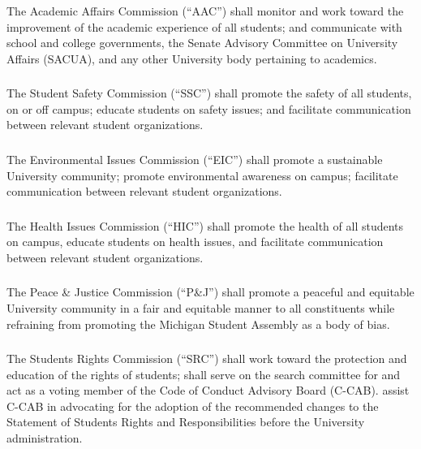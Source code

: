 \subsubsection{}
The Academic Affairs Commission (``AAC'') shall 
\subsubsubsection{}
monitor and work toward the improvement of the academic experience of all students; and
\subsubsubsection{}
communicate with school and college governments, the Senate Advisory Committee on University Affairs (SACUA), and any other University body pertaining to academics.

\subsubsection{}
The Student Safety Commission (``SSC'') shall promote the safety of all students, on or off campus; educate students on safety issues; and facilitate communication between relevant student organizations.

\subsubsection{}
The Environmental Issues Commission (``EIC'') shall
\subsubsubsection{}
promote a sustainable University community;
\subsubsubsection{}
promote environmental awareness on campus;
\subsubsubsection{}
facilitate communication between relevant student organizations.

\subsubsection{}
The Health Issues Commission (``HIC'') shall promote the health of all students on campus, educate students on health issues, and facilitate communication between relevant student organizations.

\subsubsection{}
The Peace \& Justice Commission (``P\&J'') shall promote a peaceful and equitable University community in a fair and equitable manner to all constituents while refraining from promoting the Michigan Student Assembly as a body of bias.

\subsubsection{}
The Students Rights Commission (``SRC'') shall 
\subsubsubsection{}
work toward the protection and education of the rights of students;
\subsubsubsection{}
shall serve on the search committee for and act as a voting member of the Code of Conduct Advisory Board (C-CAB).
\subsubsubsection{}
assist C-CAB in advocating for the adoption of the recommended changes to the Statement of Students Rights and Responsibilities before the University administration.

